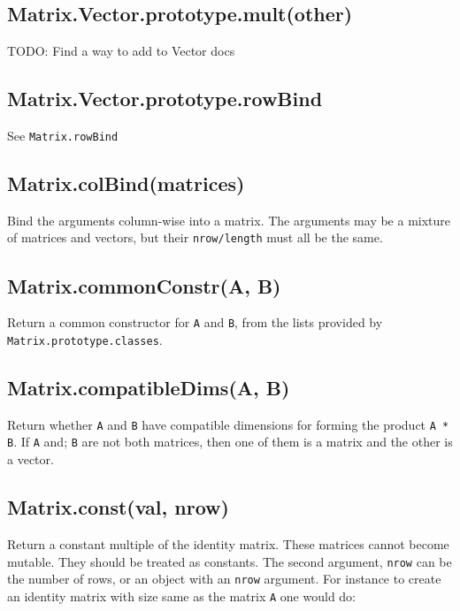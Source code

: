 \documentclass{article}
\begin{document}
    \subsection*{Matrix.Vector.prototype.mult(other)}
    TODO: Find a way to add to Vector docs


    \subsection*{Matrix.Vector.prototype.rowBind}
    See \texttt{Matrix.rowBind}


    \subsection*{Matrix.colBind(matrices)}
    Bind the arguments column-wise into a matrix. The arguments may be a
mixture of matrices and vectors, but their \texttt{nrow/length} must all be the same.


    \subsection*{Matrix.commonConstr(A, B)}
    Return a common constructor for \texttt{A} and \texttt{B}, from the lists provided by
\texttt{Matrix.prototype.classes}.


    \subsection*{Matrix.compatibleDims(A, B)}
    Return whether \texttt{A} and \texttt{B} have compatible dimensions for
forming the product \texttt{A * B}.  If \texttt{A} and; \texttt{B} are not both matrices, then
one of them is a matrix and the other is a vector.


    \subsection*{Matrix.const(val, nrow)}
    Return a constant multiple of the identity matrix. These matrices cannot become mutable.
They should be treated as constants.
The second argument, \texttt{nrow} can be the number of rows, or an object with an \texttt{nrow}
argument. For instance to create an identity matrix with size same as the matrix \texttt{A}
one would do:
\end{document}

